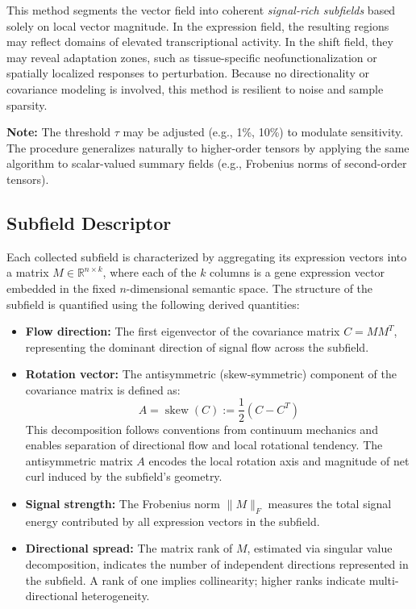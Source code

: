 \documentclass{article}
\begin{document}
This method segments the vector field into coherent \emph{signal-rich subfields} based solely on local vector magnitude. In the expression field, the resulting regions may reflect domains of elevated transcriptional activity. In the shift field, they may reveal adaptation zones, such as tissue-specific neofunctionalization or spatially localized responses to perturbation. Because no directionality or covariance modeling is involved, this method is resilient to noise and sample sparsity.

\textbf{Note:} The threshold \( \tau \) may be adjusted (e.g., 1\%, 10\%) to modulate sensitivity. The procedure generalizes naturally to higher-order tensors by applying the same algorithm to scalar-valued summary fields (e.g., Frobenius norms of second-order tensors).

\subsection{Subfield Descriptor}
\label{sec:subfield_descriptor}

Each collected subfield is characterized by aggregating its expression vectors into a matrix \( M \in \mathbb{R}^{n \times k} \), where each of the \( k \) columns is a gene expression vector embedded in the fixed \( n \)-dimensional semantic space. The structure of the subfield is quantified using the following derived quantities:

\begin{itemize}
    \item \textbf{Flow direction:} The first eigenvector of the covariance matrix \( C = M M^T \), representing the dominant direction of signal flow across the subfield.

    \item \textbf{Rotation vector:} The antisymmetric (skew-symmetric) component of the covariance matrix is defined as:
    \[
    A = \operatorname{skew}(C) := \frac{1}{2}(C - C^T)
    \]
    This decomposition follows conventions from continuum mechanics and enables separation of directional flow and local rotational tendency. The antisymmetric matrix \( A \) encodes the local rotation axis and magnitude of net curl induced by the subfield’s geometry.

    \item \textbf{Signal strength:} The Frobenius norm \( \|M\|_F \) measures the total signal energy contributed by all expression vectors in the subfield.

    \item \textbf{Directional spread:} The matrix rank of \( M \), estimated via singular value decomposition, indicates the number of independent directions represented in the subfield. A rank of one implies collinearity; higher ranks indicate multi-directional heterogeneity.
\end{itemize}
\end{document}
